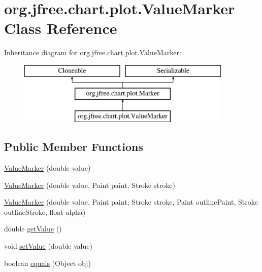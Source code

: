\hypertarget{classorg_1_1jfree_1_1chart_1_1plot_1_1_value_marker}{}\section{org.\+jfree.\+chart.\+plot.\+Value\+Marker Class Reference}
\label{classorg_1_1jfree_1_1chart_1_1plot_1_1_value_marker}
Inheritance diagram for org.\+jfree.\+chart.\+plot.\+Value\+Marker\+:\begin{figure}[H]
\begin{center}
\leavevmode
\includegraphics[height=3.000000cm]{classorg_1_1jfree_1_1chart_1_1plot_1_1_value_marker}
\end{center}
\end{figure}
\subsection*{Public Member Functions}
\begin{DoxyCompactItemize}
\item 
\mbox{\hyperlink{classorg_1_1jfree_1_1chart_1_1plot_1_1_value_marker_a271d02c23fcb67696dcdd165ce7f2acb}{Value\+Marker}} (double value)
\item 
\mbox{\hyperlink{classorg_1_1jfree_1_1chart_1_1plot_1_1_value_marker_a35a977e887c4197876c9893ecb668496}{Value\+Marker}} (double value, Paint paint, Stroke stroke)
\item 
\mbox{\hyperlink{classorg_1_1jfree_1_1chart_1_1plot_1_1_value_marker_a501ba501a5210f8aaf0564e79657ecff}{Value\+Marker}} (double value, Paint paint, Stroke stroke, Paint outline\+Paint, Stroke outline\+Stroke, float alpha)
\item 
double \mbox{\hyperlink{classorg_1_1jfree_1_1chart_1_1plot_1_1_value_marker_a35a29a86d49dfc6421c05bd3e2ea338a}{get\+Value}} ()
\item 
void \mbox{\hyperlink{classorg_1_1jfree_1_1chart_1_1plot_1_1_value_marker_ada4141a954851d1d3a918c0a1f79398b}{set\+Value}} (double value)
\item 
boolean \mbox{\hyperlink{classorg_1_1jfree_1_1chart_1_1plot_1_1_value_marker_a6652485f184df0eea54fba773124a56b}{equals}} (Object obj)
\end{DoxyCompactItemize}

